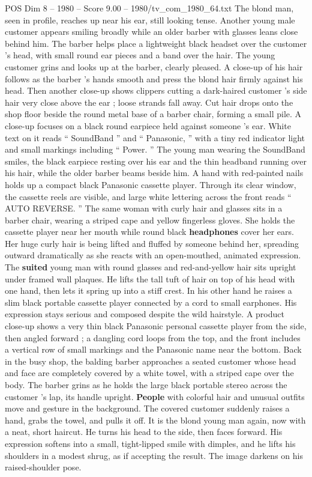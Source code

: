 \begin{textsample}{POS Dim 8 – 1980 – Score 9.00 – 1980/tv\_com\_1980\_64.txt}
The blond man, seen in profile, reaches up near his ear, still looking tense.
Another young male customer appears smiling broadly while an older barber with glasses leans close behind him.
The barber helps place a lightweight black headset over the customer ’s head, with small round ear pieces and a band over the hair.
The young customer grins and looks up at the barber, clearly pleased.
A close-up of his hair follows as the barber ’s hands smooth and press the blond hair firmly against his head.
Then another close-up shows clippers cutting a dark-haired customer ’s side hair very close above the ear ; loose strands fall away.
Cut hair drops onto the shop floor beside the round metal base of a barber chair, forming a small pile.
A close-up focuses on a black round earpiece held against someone ’s ear.
White text on it reads “ SoundBand ” and “ Panasonic, ” with a tiny red indicator light and small markings including “ Power. ” The young man wearing the SoundBand smiles, the black earpiece resting over his ear and the thin headband running over his hair, while the older barber beams beside him.
A hand with red-painted nails holds up a compact black Panasonic cassette player.
Through its clear window, the cassette reels are visible, and large white lettering across the front reads “ AUTO REVERSE. ” The same woman with curly hair and glasses sits in a barber chair, wearing a striped cape and yellow fingerless gloves.
She holds the cassette player near her mouth while round black \textbf{headphones} cover her ears.
Her huge curly hair is being lifted and fluffed by someone behind her, spreading outward dramatically as she reacts with an open-mouthed, animated expression.
The \textbf{suited} young man with round glasses and red-and-yellow hair sits upright under framed wall plaques.
He lifts the tall tuft of hair on top of his head with one hand, then lets it spring up into a stiff crest.
In his other hand he raises a slim black portable cassette player connected by a cord to small earphones.
His expression stays serious and composed despite the wild hairstyle.
A product close-up shows a very thin black Panasonic personal cassette player from the side, then angled forward ; a dangling cord loops from the top, and the front includes a vertical row of small markings and the Panasonic name near the bottom.
Back in the busy shop, the balding barber approaches a seated customer whose head and face are completely covered by a white towel, with a striped cape over the body.
The barber grins as he holds the large black portable stereo across the customer ’s lap, its handle upright. \textbf{People} with colorful hair and unusual outfits move and gesture in the background.
The covered customer suddenly raises a hand, grabs the towel, and pulls it off.
It is the blond young man again, now with a neat, short haircut.
He turns his head to the side, then faces forward.
His expression softens into a small, tight-lipped smile with dimples, and he lifts his shoulders in a modest shrug, as if accepting the result.
The image darkens on his raised-shoulder pose.

\end{textsample}
